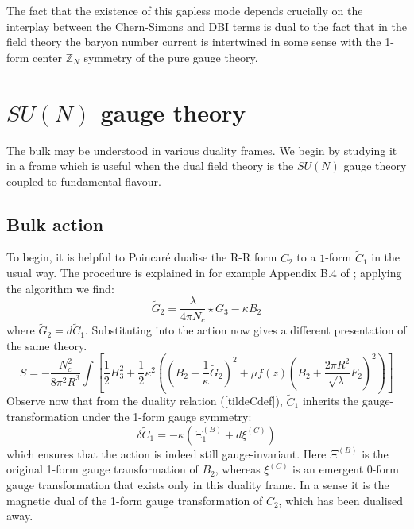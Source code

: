 \documentclass[aps,preprint,nofootinbib,preprintnumbers,eqsecnum,superscriptaddress]{revtex4}
\begin{document}
The fact that the existence of this gapless mode depends crucially on the interplay between the Chern-Simons and DBI terms is dual to the fact that in the field theory the baryon number current is intertwined in some sense with the 1-form center $\mathbb{Z}_{N}$ symmetry of the pure gauge theory. 

\section{\texorpdfstring{$SU(N)$}{SU(N)} gauge theory} \label{sec:SU} 
The bulk may be understood in various duality frames. We begin by studying it in a frame which is useful when the dual field theory is the $SU(N)$ gauge theory coupled to fundamental flavour. 
\subsection{Bulk action}
To begin, it is helpful to Poincar\'e dualise the R-R form $C_2$ to a $1$-form $\tilde{C}_1$ in the usual way. The procedure is explained in for example Appendix B.4 of \cite{Polchinski:1998rr}; applying the algorithm we find:
\begin{equation}
	\tilde{G}_2 = \frac{\lambda}{4 \pi N_c} \star G_3 - \kappa B_2 \label{tildeCdef} 
\end{equation}
where $\tilde{G}_2 = d\tilde{C}_1$. Substituting into the action now gives a different presentation of the same theory. 
\begin{equation}
	S = - \frac{N_c^2}{8 \pi^2 R^3}\int{\left[\frac{1}{2}H_3^2 + \frac{1}{2}\kappa^2 \left(\left(B_2 + \frac{1}{\kappa} \tilde{G}_2\right)^2 + \mu f(z)\left(B_2 + \frac{2 \pi R^2}{\sqrt{\lambda}} F_2 \right)^2 \right)\right]}
\end{equation}
Observe now that from the duality relation (\ref{tildeCdef}), $\tilde{C}_1$ inherits the gauge-transformation under the 1-form gauge symmetry:
\begin{equation}
\delta \tilde{C}_1 = - \kappa \left(\Xi^{(B)}_1 + d \xi^{(C)}\right)
\end{equation}
which ensures that the action is indeed still gauge-invariant. Here $\Xi^{(B)}$ is the original 1-form gauge transformation of $B_2$, whereas $\xi^{(C)}$ is an emergent 0-form gauge transformation that exists only in this duality frame. In a sense it is the magnetic dual of the 1-form gauge transformation of $C_2$, which has been dualised away. 
\end{document}
